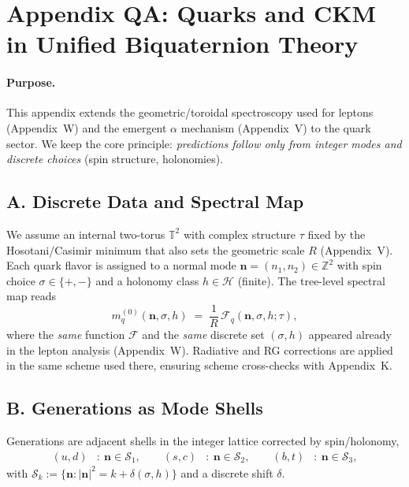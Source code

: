 \appendix
\section*{Appendix QA: Quarks and CKM in Unified Biquaternion Theory}

\paragraph{Purpose.}
This appendix extends the geometric/toroidal spectroscopy used for leptons (Appendix~W) and
the emergent $\alpha$ mechanism (Appendix~V) to the quark sector. We keep the core principle:
\emph{predictions follow only from integer modes and discrete choices} (spin structure, holonomies).

\subsection*{A. Discrete Data and Spectral Map}
We assume an internal two-torus $\mathbb{T}^2$ with complex structure $\tau$ fixed by the
Hosotani/Casimir minimum that also sets the geometric scale $R$ (Appendix~V).
Each quark flavor is assigned to a normal mode $\mathbf{n}=(n_1,n_2)\in\mathbb{Z}^2$ with spin choice
$\sigma\in\{+,-\}$ and a holonomy class $h\in\mathcal{H}$ (finite). The tree-level spectral map reads
\begin{equation}
  m^{(0)}_{q}(\mathbf n,\sigma,h) \;=\; \frac{1}{R}\,\mathcal{F}_q\!\left(\mathbf n,\sigma,h;\tau\right),
  \label{eq:QA:m_tree}
\end{equation}
where the \emph{same} function $\mathcal{F}$ and the \emph{same} discrete set $(\sigma,h)$
appeared already in the lepton analysis (Appendix~W). Radiative and RG corrections are applied
in the same scheme used there, ensuring scheme cross-checks with Appendix~K.

\subsection*{B. Generations as Mode Shells}
Generations are adjacent shells in the integer lattice corrected by spin/holonomy,
\begin{align}
  (u,d) &: \ \mathbf n\in\mathcal S_1,\qquad
  (s,c) &: \ \mathbf n\in\mathcal S_2,\qquad
  (b,t) &: \ \mathbf n\in\mathcal S_3,
\end{align}
with $\mathcal S_k := \{ \mathbf n : |\mathbf n|^2 = k + \delta(\sigma,h)\}$ and a discrete shift $\delta$.

